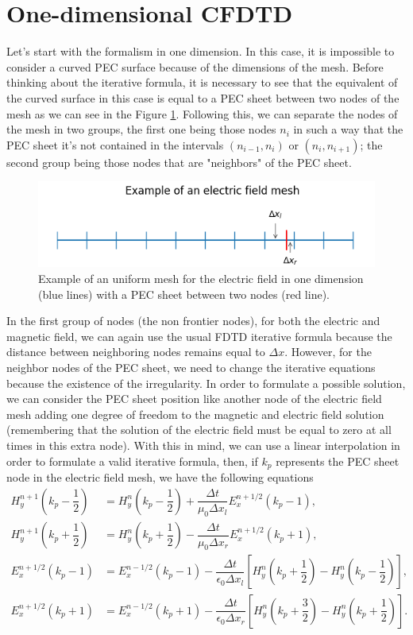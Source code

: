 \documentclass[12pt, oneside]{book}
\begin{document}
\section{One-dimensional CFDTD}
Let's start with the formalism in one dimension. In this case, it is impossible to consider a curved PEC surface because of the dimensions of the mesh. Before thinking about the iterative formula, it is necessary to see that the equivalent of the curved surface in this case is equal to a PEC sheet between two nodes of the mesh as we can see in the Figure \ref{fig:Mesh1D_CFDTD}. Following this, we can separate the nodes of the mesh in two groups, the first one being those nodes $n_i$ in such a way that the PEC sheet it's not contained in the intervals $(n_{i-1}, n_i)$ or $(n_i, n_{i+1})$; the second group being those nodes that are "neighbors" of the PEC sheet. 
\begin{figure}[H]
    \centering
    \includegraphics[scale=1]{Imagenes/Mesh1D_CFDTD.png}
    \caption{Example of an uniform mesh for the electric field in one dimension (blue lines) with a PEC sheet between two nodes (red line).}
    \label{fig:Mesh1D_CFDTD}
\end{figure}
In the first group of nodes (the non frontier nodes), for both the electric and magnetic field, we can again use the usual FDTD iterative formula because the distance between neighboring nodes remains equal to $\Delta x$. However, for the neighbor nodes of the PEC sheet, we need to change the iterative equations because the existence of the irregularity. In order to formulate a possible solution, we can consider the PEC sheet position like another node of the electric field mesh adding one degree of freedom to the magnetic and electric field solution (remembering that the solution of the electric field must be equal to zero at all times in this extra node). With this in mind, we can use a linear interpolation in order to formulate a valid iterative formula, then, if $k_p$ represents the PEC sheet node in the electric field mesh, we have the following equations
\begin{align}
    H_y^{n+1} \left( k_p - \dfrac{1}{2} \right) &= H_y^{n} \left( k_p - \dfrac{1}{2} \right) + \dfrac{\Delta t}{\mu_0 \Delta x_l}E_x^{n+1/2}(k_p - 1), \\
    H_y^{n+1} \left( k_p + \dfrac{1}{2} \right) &= H_y^{n} \left( k_p + \dfrac{1}{2} \right) - \dfrac{\Delta t}{\mu_0 \Delta x_r}E_x^{n+1/2}(k_p + 1), \\
    E_x^{n+1/2}(k_p - 1) &= E_x^{n-1/2}(k_p - 1) - \dfrac{\Delta t}{\epsilon_0 \Delta x_l} \left[  H_y^{n} \left( k_p + \dfrac{1}{2} \right) -  H_y^{n} \left( k_p - \dfrac{1}{2} \right) \right], \\
    E_x^{n+1/2}(k_p + 1) &= E_x^{n-1/2}(k_p + 1) - \dfrac{\Delta t}{\epsilon_0 \Delta x_r} \left[  H_y^{n} \left( k_p + \dfrac{3}{2} \right) -  H_y^{n} \left( k_p + \dfrac{1}{2} \right) \right].
\end{align}
\end{document}
